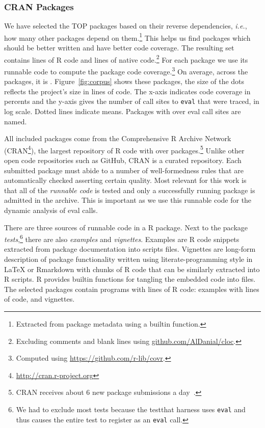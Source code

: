 \documentclass[a4paper,USenglish,cleveref, autoref, thm-restate]{lipics-v2019}
\newcommand{\ie}{\emph{i.e.},\xspace}
\newcommand{\eval}{\texttt{eval}\xspace}
\begin{document}
\subsubsection{CRAN Packages}

We have selected the TOP \CorpusPackages packages based on their reverse
dependencies, \ie how many other packages depend on them.\footnote{Extracted
  from package metadata using a builtin function.}  This helps us find
packages which should be better written and have better code coverage.  The
resulting set contains \CorpusRCodeRnd lines of R code and
\CorpusNativeCodeRnd lines of native code.\footnote{Excluding comments and
  blank lines using \url{github.com/AlDanial/cloc}.}  For each package we
use its runnable code to compute the package code coverage.\footnote{Computed
  using \url{ https://github.com/r-lib/covr}.} On average, across the
\CorpusPackages packages, it is \CorpusMeanExprCoverage.
Figure~\ref{fig:corpus} shows these packages, the size of the dots reflects
the project's size in lines of code.  The x-axis indicates code coverage in
percents and the y-axis gives the number of call sites to \eval that were traced, in log
scale. Dotted lines indicate means. Packages with over
\CorpusEvalsPackageTreshold eval call sites are named.

All included packages come from the Comprehensive R Archive Network
(CRAN\footnote{\url{http://cran.r-project.org}}), the largest repository of R
code with over \CorpusAllCranRnd packages.\footnote{CRAN receives about 6 new
  package submissions a day~\cite{Ligges2017}.} Unlike other open code
repositories such as GitHub, CRAN is a curated repository. Each submitted
package must abide to a number of well-formedness rules that are automatically
checked asserting certain quality. Most relevant for this work is that all of
the \emph{runnable code} is tested and only a successfully running package is
admitted in the archive. This is important as we use this runnable code for the
dynamic analysis of eval calls.

There are three sources of runnable code in a R package. Next to the package
\emph{tests},\footnote{We had to exclude most tests because the {testthat}
  harness uses \eval and thus causes the entire test to register as an \eval
  call.} there are also \emph{examples} and \emph{vignettes}. Examples are R
code snippets extracted from package documentation into scripts files.
Vignettes are long-form description of package functionality written using
literate-programming style in \LaTeX\xspace or Rmarkdown with chunks of R
code that can be similarly extracted into R scripts. R provides builtin
functions for tangling the embedded code into files.  The selected packages
contain \CorpusPackagePrograms programs with \CorpusPackageProgramsCodeRnd
lines of R code: \CorpusExamplesProgramsRnd examples with
\CorpusExamplesCodeRnd lines of code, and \CorpusVignettesProgramsRnd
vignettes.
\end{document}
